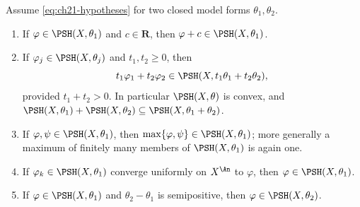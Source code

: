 \begin{theorem}
\label{thm:ch21-stability}
Assume \eqref{eq:ch21-hypotheses} for two closed model forms
$\theta_1,\theta_2$.
\begin{enumerate}
\item\label{itm:ch21-stab:const}
If $\varphi\in\PSH(X,\theta_1)$ and $c\in\mathbf R$, then
$\varphi+c\in\PSH(X,\theta_1)$.
\item\label{itm:ch21-stab:sum}
If $\varphi_j\in\PSH(X,\theta_j)$ and $t_1,t_2\geq0$, then
\[
 t_1\varphi_1+t_2\varphi_2\in\PSH(X,t_1\theta_1+t_2\theta_2),
\]
provided $t_1+t_2>0$.  In particular $\PSH(X,\theta)$ is convex, and
$\PSH(X,\theta_1)+\PSH(X,\theta_2)\subseteq\PSH(X,\theta_1+\theta_2)$.
\item\label{itm:ch21-stab:max}
If $\varphi,\psi\in\PSH(X,\theta_1)$, then
$\max\{\varphi,\psi\}\in\PSH(X,\theta_1)$; more generally a maximum of
finitely many members of $\PSH(X,\theta_1)$ is again one.
\item\label{itm:ch21-stab:unif}
If $\varphi_k\in\PSH(X,\theta_1)$ converge uniformly on $X^{\An}$ to
$\varphi$, then $\varphi\in\PSH(X,\theta_1)$.
\item\label{itm:ch21-stab:mono}
If $\varphi\in\PSH(X,\theta_1)$ and $\theta_2-\theta_1$ is semipositive,
then $\varphi\in\PSH(X,\theta_2)$.
\end{enumerate}
\end{theorem}

